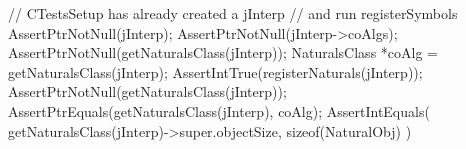 
\startCTest
  // CTestsSetup has already created a jInterp
  // and run registerSymbols
  AssertPtrNotNull(jInterp);
  AssertPtrNotNull(jInterp->coAlgs);
  AssertPtrNotNull(getNaturalsClass(jInterp));
  NaturalsClass *coAlg = getNaturalsClass(jInterp);
  AssertIntTrue(registerNaturals(jInterp));
  AssertPtrNotNull(getNaturalsClass(jInterp));
  AssertPtrEquals(getNaturalsClass(jInterp), coAlg);
  AssertIntEquals(
    getNaturalsClass(jInterp)->super.objectSize,
    sizeof(NaturalObj)
  )
\stopCTest
\stopTestCase
\stopTestSuite
